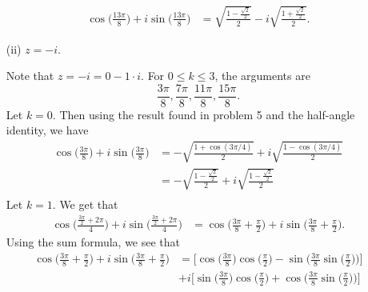 \documentclass[a4paper]{article}
\begin{document}
\begin{enumerate}
\begin{solution}
        \begin{align*}
            \cos \Big(  \frac{  13 \pi  }{ 8 }   \Big) + i \sin \Big(  \frac{ 13 \pi  }{ 8 }  \Big) &= \sqrt{ \frac{ 1 - \frac{ \sqrt{ 2 }  }{ 2 }  }{ 2 }  }  - i \sqrt{ \frac{ 1 + \frac{ \sqrt{ 2 }  }{ 2 }  }{ 2 }  }.
        \end{align*}
                \end{solution}
            \item[(ii)] \( z = -i \).
                \begin{solution}
                Note that \( z = - i = 0 - 1 \cdot i  \). For \( 0 \leq k \leq 3  \), the arguments are
                \[  \frac{ 3 \pi  }{ 8  }, \frac{ 7 \pi   }{ 8  }, \frac{ 11 \pi  }{ 8 }, \frac{ 15 \pi  }{ 8 }.  \]
                Let \( k = 0  \). Then using the result found in problem 5 and the half-angle identity, we have
                \begin{align*}
                    \cos \Big(  \frac{ 3 \pi  }{ 8  }  \Big) + i \sin \Big(  \frac{ 3 \pi  }{ 8  }  \Big) &= - \sqrt{ \frac{ 1 + \cos(3 \pi /4) }{ 2 }  }  + i \sqrt{ \frac{ 1 - \cos (3 \pi /4 ) }{ 2 }  }    \\
                                                                                                          &= - \sqrt{ \frac{ 1 - \frac{ \sqrt{ 2 }  }{ 2 }  }{ 2 }  }  + i \sqrt{ \frac{ 1 -  \frac{ \sqrt{ 2 }  }{ 2 } }{ 2 }  }    \\ 
                \end{align*}
                Let \( k = 1  \). We get that  
                \begin{align*}
                    \cos \Big(  \frac{ \frac{ 3 \pi }{ 2 } + 2 \pi }{ 4  }  \Big) + i \sin \Big(  \frac{ \frac{ 3 \pi }{ 2 }  + 2 \pi }{ 4 }  \Big) &= \cos \Big(  \frac{ 3 \pi  }{ 8  } + \frac{ \pi }{ 2 }  \Big) + i \sin \Big(  \frac{ 3 \pi }{ 8 }  + \frac{ \pi }{ 2 }  \Big). 
                \end{align*}
                Using the sum formula, we see that 
                \begin{align*}
                    \cos \Big(  \frac{ 3 \pi  }{ 8  } + \frac{ \pi }{ 2 }  \Big) + i \sin \Big(  \frac{ 3 \pi }{ 8 }  + \frac{ \pi }{ 2 }  \Big) &= \Big[ \cos \Big(  \frac{ 3 \pi  }{ 8 }  \Big) \cos \Big(  \frac{  \pi  }{  2  }  \Big) - \sin \Big(  \frac{ 3 \pi  }{ 8  }  \sin \Big(  \frac{ \pi }{ 2 }  \Big) \Big)\Big]   \\
                                                                                                                                                 &+ i \Big[ \sin \Big(  \frac{ 3 \pi  }{ 8 }  \Big) \cos \Big(  \frac{  \pi  }{ 2 }  \Big) + \cos \Big(  \frac{  3 \pi  }{ 8  }  \sin \Big(  \frac{ \pi }{ 2 }  \Big) \Big) \Big] \\

\end{align*}
\end{solution}
\end{enumerate}
\end{document}
